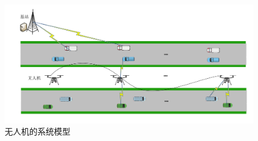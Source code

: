 \begin{figure}[H]
\centering
\includegraphics[width=12cm]{figures//chap4//第四章系统模型图.pdf}
\caption{无人机的系统模型}
\label{systemuav2}
\end{figure}

